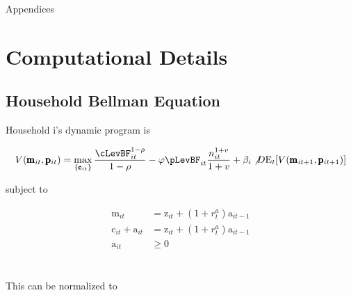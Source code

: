\documentclass[titlepage]{\econtex}\providecommand{\texname}{BufferStockTheory}
\providecommand{\FigDir}{Figures}
\begin{document}




\clearpage\vfill\eject

\appendix

\centerline{\LARGE Appendices}\vspace{0.2in}




\hypertarget{Computational Details}{}
\section{Computational Details}

\hypertarget{Household Bellman Equation }{}
\subsection{Household Bellman Equation}

Household i's dynamic program is

$$ V(\pmb{\mathrm{m}}_{it},\pmb{\mathrm{p}}_{it})=\max_{ \{ \pmb{\mathrm{c}}_{it}\}} { \frac{\cLevBF_{i t}^{1-\rho}}{1 -\rho} - \varphi \pLevBF_{it} \frac{n_{it}^{1+v}}{1+v} + \beta_{i} \not D \mathrm{E}_{t}[V( \pmb{\mathrm{m}}_{it+1} , \pmb{\mathrm{p}}_{it+1})]}$$

subject to 

\begin{align*}
 \pmb{\mathrm{m}}_{i t} & = \pmb{\mathrm{z}}_{i t}  + (1+\mathit{r}^{a}_{t})\pmb{\mathrm{a}}_{i t-1} \\
 \pmb{\mathrm{c}}_{i t}  + \pmb{\mathrm{a}}_{i t} &= \pmb{\mathrm{z}}_{i t}  + (1+\mathit{r}^{a}_{t}) \pmb{\mathrm{a}}_{i t-1}   \\
\pmb{\mathrm{a}}_{it} &\geq 0 
\end{align*} \\ \\

This can be normalized to \\
\end{document}
